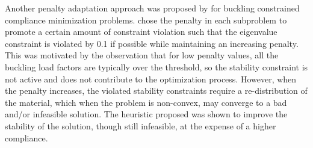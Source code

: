 Another penalty adaptation approach was proposed by \cite{GaoXingjun2017} for buckling constrained compliance minimization problems. \cite{GaoXingjun2017} chose the penalty in each subproblem to promote a certain amount of constraint violation such that the eigenvalue constraint is violated by 0.1 if possible while maintaining an increasing penalty. This was motivated by the observation that for low penalty values, all the buckling load factors are typically over the threshold, so the stability constraint is not active and does not contribute to the optimization process. However, when the penalty increases, the violated stability constraints require a re-distribution of the material, which when the problem is non-convex, may converge to a bad and/or infeasible solution. The heuristic proposed was shown to improve the stability of the solution, though still infeasible, at the expense of a higher compliance.

